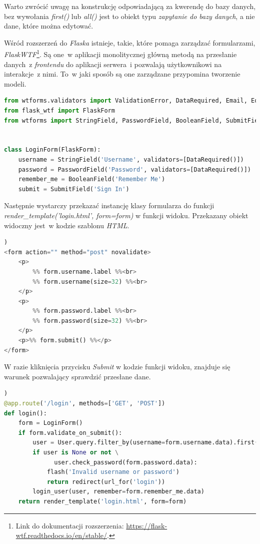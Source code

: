 Warto zwrócić uwagę na konstrukcję odpowiadającą za kwerendę do bazy danych, bez wywołania \textit{first()} lub \textit{all()} jest to obiekt typu \textit{zapytanie do bazy danych}\cite{flasksql}, a nie dane, które można edytować.

Wśród rozszerzeń do \textit{Flaska} istnieje, takie, które pomaga zarządzać formularzami, \textit{FlaskWTF}\footnote{Link do dokumentacji rozszerzenia: \url{https://flask-wtf.readthedocs.io/en/stable/}.}. Są one~w aplikacji monolitycznej główną metodą na przesłanie danych~z \textit{frontendu} do aplikacji serwera~i pozwalają użytkownikowi na interakcje~z nimi. To~w jaki sposób są one zarządzane przypomina tworzenie modeli.

\begin{lstlisting}[language=Python, caption={Tworzenie formularzy przy pomocy \textit{FlaskWTF}. Przykład formularza do rejestracji użytkownika.}]
from wtforms.validators import ValidationError, DataRequired, Email, EqualTo
from flask_wtf import FlaskForm
from wtforms import StringField, PasswordField, BooleanField, SubmitField, TextField, TextAreaField


class LoginForm(FlaskForm):
    username = StringField('Username', validators=[DataRequired()])
    password = PasswordField('Password', validators=[DataRequired()])
    remember_me = BooleanField('Remember Me')
    submit = SubmitField('Sign In')
\end{lstlisting}
Następnie wystarczy przekazać instancję klasy formularza do funkcji \\ \textit{render\_template('login.html', form=form)} w funkcji widoku. Przekazany obiekt widoczny jest~w kodzie szablonu \textit{HTML}.
\begin{lstlisting}[language=Python, caption={Uproszczony formularz \textit{FlaskWTF} zaimplementowany w pliku \textit{login.html}.}])
<form action="" method="post" novalidate>
    <p>
  		%% form.username.label %%<br>
       	%% form.username(size=32) %%<br>
    </p>
    <p>
    	%% form.password.label %%<br>
       	%% form.password(size=32) %%<br>
    </p>
    <p>%% form.submit() %%</p>
</form>
\end{lstlisting}
W razie kliknięcia przycisku \textit{Submit} w kodzie funkcji widoku, znajduje się warunek pozwalający sprawdzić przesłane dane.
\begin{lstlisting}[language=Python, caption={Sprawdzenie przesłanych danych z formularza logowania w widoku.}])
@app.route('/login', methods=['GET', 'POST'])
def login(): 
    form = LoginForm()
    if form.validate_on_submit():
        user = User.query.filter_by(username=form.username.data).first()
        if user is None or not \
        	  user.check_password(form.password.data):
            flash('Invalid username or password')
            return redirect(url_for('login'))
        login_user(user, remember=form.remember_me.data)
    return render_template('login.html', form=form)	
\end{lstlisting}


